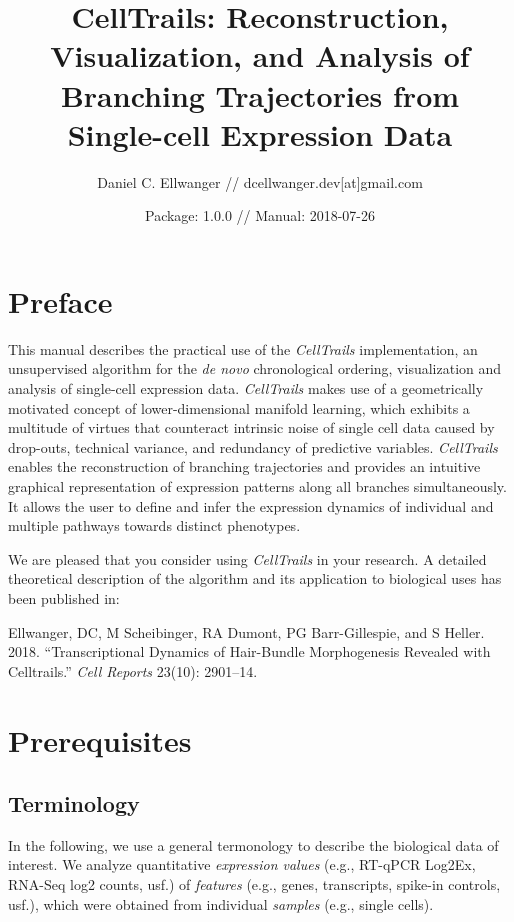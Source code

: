 \documentclass[]{book}
\title{CellTrails: Reconstruction, Visualization, and Analysis of Branching
Trajectories from Single-cell Expression Data}
\author{Daniel C. Ellwanger // dcellwanger.dev{[}at{]}gmail.com}
\date{Package: 1.0.0 // Manual: 2018-07-26}
\theoremstyle{definition}
\theoremstyle{definition}
\theoremstyle{definition}
\theoremstyle{remark}
\begin{document}
\maketitle

{
\setcounter{tocdepth}{1}
\tableofcontents
}
\chapter*{Preface}\label{preface}

This manual describes the practical use of the \emph{CellTrails}
implementation, an unsupervised algorithm for the \emph{de novo}
chronological ordering, visualization and analysis of single-cell
expression data. \emph{CellTrails} makes use of a geometrically
motivated concept of lower-dimensional manifold learning, which exhibits
a multitude of virtues that counteract intrinsic noise of single cell
data caused by drop-outs, technical variance, and redundancy of
predictive variables. \emph{CellTrails} enables the reconstruction of
branching trajectories and provides an intuitive graphical
representation of expression patterns along all branches simultaneously.
It allows the user to define and infer the expression dynamics of
individual and multiple pathways towards distinct phenotypes.

We are pleased that you consider using \emph{CellTrails} in your
research. A detailed theoretical description of the algorithm and its
application to biological uses has been published in:

Ellwanger, DC, M Scheibinger, RA Dumont, PG Barr-Gillespie, and S
Heller. 2018. ``Transcriptional Dynamics of Hair-Bundle Morphogenesis
Revealed with Celltrails.'' \emph{Cell Reports} 23(10): 2901--14.

\chapter{Prerequisites}\label{prerequisites}

\section{Terminology}\label{terminology}

In the following, we use a general termonology to describe the
biological data of interest. We analyze quantitative \emph{expression
values} (e.g., RT-qPCR Log2Ex, RNA-Seq log2 counts, usf.) of
\emph{features} (e.g., genes, transcripts, spike-in controls, usf.),
which were obtained from individual \emph{samples} (e.g., single cells).
\end{document}
